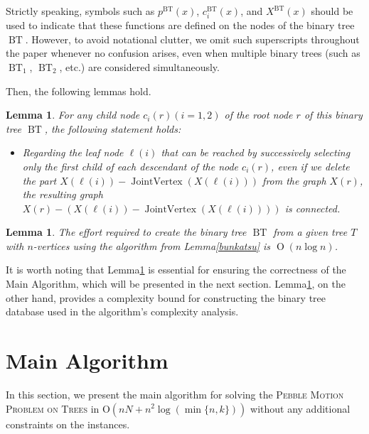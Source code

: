 \documentclass[letter,11pt]{article}
\newtheorem{la}[thm]{Lemma}
\theoremstyle{definition}
\theoremstyle{definition}
\DeclareMathOperator{\Od}{O}
\DeclareMathOperator{\BT}{BT}
\DeclareMathOperator{\JoiV}{JointVertex}
\newcommand{\1}{\boldmath$~1~$\unboldmath}
\newcommand{\Ord}{\mathrm{O}}
\newcommand{\tume}{\hspace*{0.2em}}
\begin{document}
Strictly speaking, symbols such as $p^{\BT}(x)$, $c^{\BT}_i(x)$,
and $X^{\BT}(x)$ should be used to indicate that these functions are
defined on the nodes of the binary tree $\BT$.
However, to avoid notational clutter, we omit such superscripts
throughout the paper whenever no confusion arises, even when
multiple binary trees (such as $\BT_1$, $\BT_2$, etc.) are considered
simultaneously.

Then, the following lemmas hold. 
\begin{la}\label{children}
For any child node $c_i(r) (i=1,2)$ of the root node $r$ of this binary tree $\BT$, the following statement holds:
\begin{itemize}
\item{Regarding the leaf node $\ell(i)$ that can be reached by successively selecting only the first child of each descendant of the node $c_i(r)$, even if we delete the part $X(\ell(i))-\JoiV(X(\ell(i)))$ from the graph $X(r)$, the resulting graph $X(r)-(X(\ell(i))-\JoiV(X(\ell(i))))$ is connected. 
}
\end{itemize}
\end{la}


\begin{la}\label{BT}
The effort required to create the binary tree $\BT$ from a given tree $T$ with $n$-vertices using the algorithm from Lemma\tume\ref{bunkatsu} is $\Od(n\log n)$. 
\end{la}

It is worth noting that Lemma\tume\ref{children} is essential for ensuring the correctness of the Main Algorithm, 
which will be presented in the next section. 
Lemma\tume\ref{BT}, on the other hand, provides a complexity bound for constructing the binary tree database 
used in the algorithm's complexity analysis.


\section{Main Algorithm}\label{MainAlg}


In this section, we present the main algorithm for solving the \textsc{Pebble Motion Problem on Trees} in $\Ord(nN+n^2\log(\min\{n,k\}))$ 
without any additional constraints on the instances.
\end{document}

